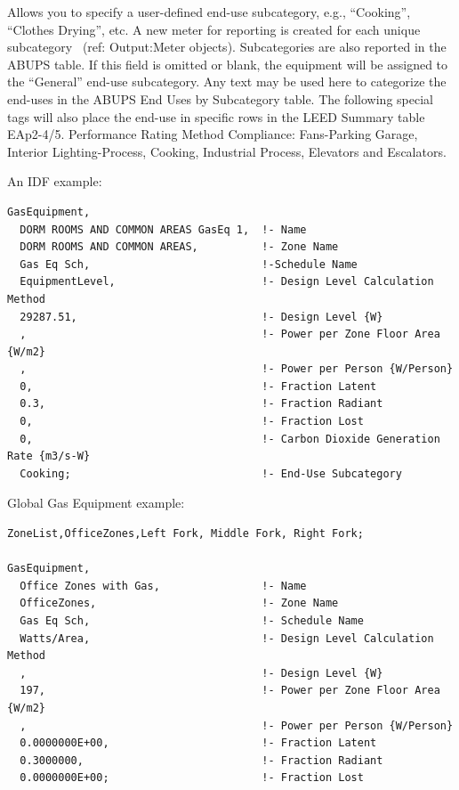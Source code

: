 Allows you to specify a user-defined end-use subcategory, e.g., ``Cooking'', ``Clothes Drying'', etc. A new meter for reporting is created for each unique subcategory~ (ref: Output:Meter objects). Subcategories are also reported in the ABUPS table. If this field is omitted or blank, the equipment will be assigned to the ``General'' end-use subcategory. Any text may be used here to categorize the end-uses in the ABUPS End Uses by Subcategory table. The following special tags will also place the end-use in specific rows in the LEED Summary table EAp2-4/5. Performance Rating Method Compliance:  Fans-Parking Garage, Interior Lighting-Process, Cooking, Industrial Process, Elevators and Escalators.

An IDF example:

\begin{lstlisting}
GasEquipment,
  DORM ROOMS AND COMMON AREAS GasEq 1,  !- Name
  DORM ROOMS AND COMMON AREAS,          !- Zone Name
  Gas Eq Sch,                           !-Schedule Name
  EquipmentLevel,                       !- Design Level Calculation Method
  29287.51,                             !- Design Level {W}
  ,                                     !- Power per Zone Floor Area {W/m2}
  ,                                     !- Power per Person {W/Person}
  0,                                    !- Fraction Latent
  0.3,                                  !- Fraction Radiant
  0,                                    !- Fraction Lost
  0,                                    !- Carbon Dioxide Generation Rate {m3/s-W}
  Cooking;                              !- End-Use Subcategory
\end{lstlisting}

Global Gas Equipment example:

\begin{lstlisting}
ZoneList,OfficeZones,Left Fork, Middle Fork, Right Fork;

GasEquipment,
  Office Zones with Gas,                !- Name
  OfficeZones,                          !- Zone Name
  Gas Eq Sch,                           !- Schedule Name
  Watts/Area,                           !- Design Level Calculation Method
  ,                                     !- Design Level {W}
  197,                                  !- Power per Zone Floor Area {W/m2}
  ,                                     !- Power per Person {W/Person}
  0.0000000E+00,                        !- Fraction Latent
  0.3000000,                            !- Fraction Radiant
  0.0000000E+00;                        !- Fraction Lost
\end{lstlisting}

